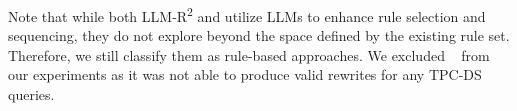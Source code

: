 \begin{itemize}[leftmargin=0.5cm]












    

\end{itemize}

Note that while both \textsc{LLM-R\textsuperscript{2}} and \rbot utilize LLMs to enhance rule selection and sequencing, they do not explore beyond the space defined by the existing rule set. Therefore, we still classify them as rule-based approaches. We excluded ~\cite{wetune} from our experiments as it was not able to produce valid rewrites for any TPC-DS queries.

